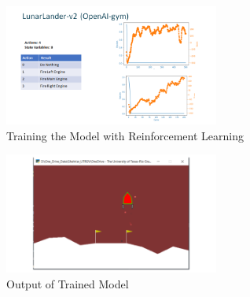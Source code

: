 \documentclass[conference]{IEEEtran}
\begin{document}
\begin{figure}[hbtp]
\centerline{\includegraphics[width=200pt]{images/results1.png}}
\caption{Training the Model with Reinforcement Learning}
\label{TrainResults}
\end{figure}

\begin{figure}[hbtp]
\centerline{\includegraphics[width=200pt]{images/demo.png}}
\caption{Output of Trained Model}
\label{Demo}
\end{figure}
\end{document}
